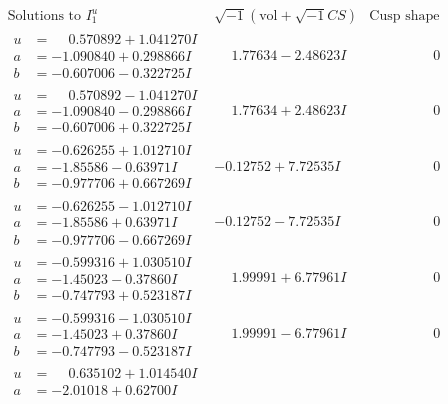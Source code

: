 \documentclass[1p]{elsarticle_modified}
\theoremstyle{definition}
\newcommand{\I}{\sqrt{-1}}
\begin{document}
$$\begin{array}{c|c|c}
\text{Solutions to }I^u_{1}& \I (\text{vol} + \sqrt{-1}CS) & \text{Cusp shape}\\
 \hline 
\begin{aligned}
u &= \phantom{-}0.570892 + 1.041270 I \\
a &= -1.090840 + 0.298866 I \\
b &= -0.607006 - 0.322725 I\end{aligned}
 & \phantom{-}1.77634 - 2.48623 I & \phantom{-0.000000 } 0 \\ \hline\begin{aligned}
u &= \phantom{-}0.570892 - 1.041270 I \\
a &= -1.090840 - 0.298866 I \\
b &= -0.607006 + 0.322725 I\end{aligned}
 & \phantom{-}1.77634 + 2.48623 I & \phantom{-0.000000 } 0 \\ \hline\begin{aligned}
u &= -0.626255 + 1.012710 I \\
a &= -1.85586 - 0.63971 I \\
b &= -0.977706 + 0.667269 I\end{aligned}
 & -0.12752 + 7.72535 I & \phantom{-0.000000 } 0 \\ \hline\begin{aligned}
u &= -0.626255 - 1.012710 I \\
a &= -1.85586 + 0.63971 I \\
b &= -0.977706 - 0.667269 I\end{aligned}
 & -0.12752 - 7.72535 I & \phantom{-0.000000 } 0 \\ \hline\begin{aligned}
u &= -0.599316 + 1.030510 I \\
a &= -1.45023 - 0.37860 I \\
b &= -0.747793 + 0.523187 I\end{aligned}
 & \phantom{-}1.99991 + 6.77961 I & \phantom{-0.000000 } 0 \\ \hline\begin{aligned}
u &= -0.599316 - 1.030510 I \\
a &= -1.45023 + 0.37860 I \\
b &= -0.747793 - 0.523187 I\end{aligned}
 & \phantom{-}1.99991 - 6.77961 I & \phantom{-0.000000 } 0 \\ \hline\begin{aligned}
u &= \phantom{-}0.635102 + 1.014540 I \\
a &= -2.01018 + 0.62700 I \\

\end{aligned}
\end{array}$$
\end{document}
